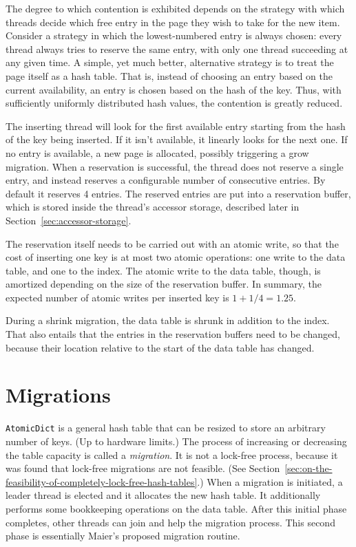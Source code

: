 The degree to which contention is exhibited depends on the strategy with which threads decide which free entry in the page they wish to take for the new item.
Consider a strategy in which the lowest-numbered entry is always chosen: every thread always tries to reserve the same entry, with only one thread succeeding at any given time.
A simple, yet much better, alternative strategy is to treat the page itself as a hash table.
That is, instead of choosing an entry based on the current availability, an entry is chosen based on the hash of the key.
Thus, with sufficiently uniformly distributed hash values, the contention is greatly reduced.

The inserting thread will look for the first available entry starting from the hash of the key being inserted.
If it isn't available, it linearly looks for the next one.
If no entry is available, a new page is allocated, possibly triggering a grow migration.
When a reservation is successful, the thread does not reserve a single entry, and instead reserves a configurable number of consecutive entries.
By default it reserves 4 entries.
The reserved entries are put into a reservation buffer, which is stored inside the thread's accessor storage, described later in Section~\ref{sec:accessor-storage}.

The reservation itself needs to be carried out with an atomic write, so that the cost of inserting one key is at most two atomic operations: one write to the data table, and one to the index.
The atomic write to the data table, though, is amortized depending on the size of the reservation buffer.
In summary, the expected number of atomic writes per inserted key is $1 + 1/4 = 1.25$.

During a shrink migration, the data table is shrunk in addition to the index.
That also entails that the entries in the reservation buffers need to be changed, because their location relative to the start of the data table has changed.


\section{Migrations}\label{sec:migrations-design}

\texttt{AtomicDict} is a general hash table that can be resized to store an arbitrary number of keys.
(Up to hardware limits.)
The process of increasing or decreasing the table capacity is called a \emph{migration}.
It is not a lock-free process, because it was found that lock-free migrations are not feasible.
(See Section~\ref{sec:on-the-feasibility-of-completely-lock-free-hash-tables}.)
When a migration is initiated, a leader thread is elected and it allocates the new hash table.
It additionally performs some bookkeeping operations on the data table.
After this initial phase completes, other threads can join and help the migration process.
This second phase is essentially Maier's proposed migration routine.

